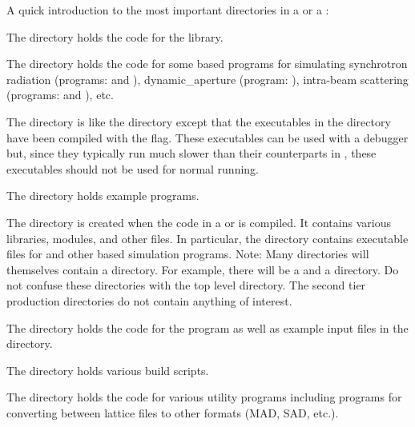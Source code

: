 \documentclass{hitec}     %
\begin{document}
A quick introduction to the most important directories in a  or a :
\begin{description}
%
\vspace{-0.4 ex}
\item[bmad] \Newline
The  directory holds the code for the \bmad library.
%
\vspace{-0.4 ex}
\item[bsim] \Newline
The  directory holds the code for some \bmad based programs for simulating
synchrotron radiation (programs:  and ), dynamic_aperture (program:
), intra-beam scattering (programs:  and ), etc.
%
\vspace{-0.4 ex}
\item[debug] \Newline
The  directory is like the  directory except that the executables in the
 directory have been compiled with the  flag. These executables can be used
with a debugger but, since they typically run much slower than their counterparts in
, these executables should not be used for normal running.
%
\vspace{-0.4 ex}
\item[examples] \Newline
The  directory holds example programs.
%
\vspace{-0.4 ex}
\item[production] \Newline
The  directory is created when the code in a  or  is
compiled. It contains various libraries, modules, and other files. In particular, the
 directory contains executable files for \tao and other \bmad based simulation
programs. Note: Many directories will themselves contain a  directory. For example,
there will be a  and a  directory. Do not confuse these
directories with the top level  directory. The second tier production directories do
not contain anything of interest.
%
\vspace{-0.4 ex}
\item[tao] \Newline
The  directory holds the code for the \tao program as well as example input
files in the  directory.
%
\vspace{-0.4 ex}
\item[util] \Newline
The  directory holds various build scripts.
%
\vspace{-0.4 ex}
\item[util_programs] \Newline
The  directory holds the code for various utility programs including programs for
converting between \bmad lattice files to other formats (MAD, SAD, etc.).

\end{description}
\end{document}
